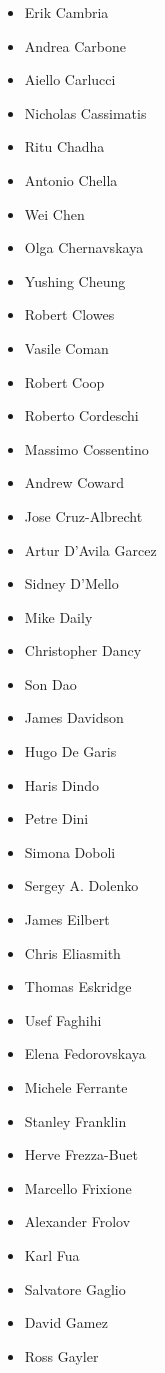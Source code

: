 \documentclass[10pt,fleqn,openany]{book} %
\begin{document}
\begin{multicols}{2}
\begin{itemize}
			\item Erik Cambria
			\item Andrea Carbone
			\item Aiello Carlucci
			\item Nicholas Cassimatis
			\item Ritu Chadha
			\item Antonio Chella
			\item Wei Chen
			\item Olga Chernavskaya
			\item Yushing Cheung
			\item Robert Clowes
			\item Vasile Coman
			\item Robert Coop
			\item Roberto Cordeschi
			\item Massimo Cossentino
			\item Andrew Coward
			\item Jose Cruz-Albrecht
			\item Artur D'Avila Garcez
			\item Sidney D'Mello
			\item Mike Daily
			\item Christopher Dancy
			\item Son Dao
			\item James Davidson
			\item Hugo De Garis
			\item Haris Dindo
			\item Petre Dini
			\item Simona Doboli
			\item Sergey A. Dolenko
			\item James Eilbert
			\item Chris Eliasmith
			\item Thomas Eskridge
			\item Usef Faghihi
			\item Elena Fedorovskaya
			\item Michele Ferrante
			\item Stanley Franklin
			\item Herve Frezza-Buet
			\item Marcello Frixione
			\item Alexander Frolov
			\item Karl Fua
			\item Salvatore Gaglio
			\item David Gamez
			\item Ross Gayler

\end{itemize}
\end{multicols}
\end{document}
